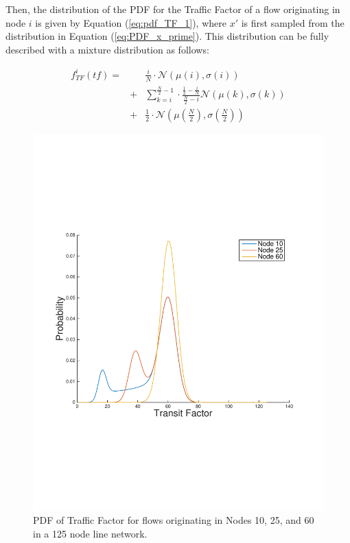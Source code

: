 Then, the distribution of the PDF for the Traffic Factor of a flow originating in node $i$ is given by Equation (\ref{eq:pdf_TF_1}), where $x'$ is first sampled from the distribution in Equation (\ref{eq:PDF_x_prime}).  This distribution can be fully described with a mixture distribution as follows:

\begin{eqnarray}
\nonumber
	f_{TF}^i (tf) = &&\frac{i}{N} \cdot \mathcal{N}(\mu(i),\sigma(i))  \\ \nonumber
			   &+& \sum\limits_{k=i}^{\frac{N}{2}-1} \cdot \frac{\frac{1}{2}-\frac{i}{N}}{\frac{N}{2} - i}\mathcal{N}(\mu(k),\sigma(k))  \\
			   &+& \frac{1}{2} \cdot \mathcal{N} (\mu(\frac{N}{2}),\sigma(\frac{N}{2}))
\label{eq:full_PDF_TF}
\end{eqnarray}

\begin{figure}
\begin{centering}
    \includegraphics[scale=0.4, clip=true, trim=15mm 65mm 20mm 65mm]{figures/PDF_TF_line_net_125.pdf}
    \caption{PDF of Traffic Factor for flows originating in Nodes 10, 25, and 60 in a 125 node line network.}
    \label{fig:PDF_TF_line_net}
\end{centering}
\end{figure}

